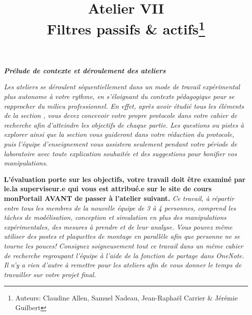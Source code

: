 \documentclass[canadien,12pt,oneside,letterpaper]{article}
\title{\textbf{Atelier VII}\\Filtres passifs \& actifs\thanks{Auteurs: Claudine Allen, Samuel Nadeau, Jean-Raphaël Carrier \& Jérémie Guilbert}}
\date{}
\begin{document}
\maketitle \vspace{-2cm}

\noindent\textit{\textbf{Prélude de contexte et déroulement des ateliers}}

\textit{Les ateliers se déroulent séquentiellement dans un mode de travail expérimental plus autonome à votre rythme, en s'éloignant du contexte pédagogique pour se rapprocher du milieu professionnel. En effet, après avoir étudié tous les éléments de la section , vous devez concevoir votre propre protocole dans votre cahier de recherche afin d'atteindre les objectifs de chaque partie. Les questions ou pistes à explorer ainsi que la section  vous guideront dans votre rédaction du protocole, puis l'équipe d'enseignement vous assistera seulement pendant votre période de laboratoire avec toute explication souhaitée et des suggestions pour bonifier vos manipulations.}

\textbf{L'évaluation porte sur les objectifs, votre travail doit être examiné par le.la superviseur.e qui vous est attribué.e sur le site de cours monPortail AVANT de passer à l'atelier suivant.} \textit{Ce travail, à répartir entre tous les membres de la nouvelle équipe de 3 à 4 personnes, comprend les tâches de modélisation, conception et simulation en plus des manipulations expérimentales, des mesures à prendre et de leur analyse. Vous pouvez même utiliser des postes et plaquettes de montage en parallèle afin que personne ne se tourne les pouces! Consignez soigneusement tout ce travail dans un même cahier de recherche regroupant l'équipe à l'aide de la fonction de partage dans OneNote. Il n'y a rien d'autre à remettre pour les ateliers afin de vous donner le temps de travailler sur votre projet final.}

\vspace{-2.5ex}
\end{document}
